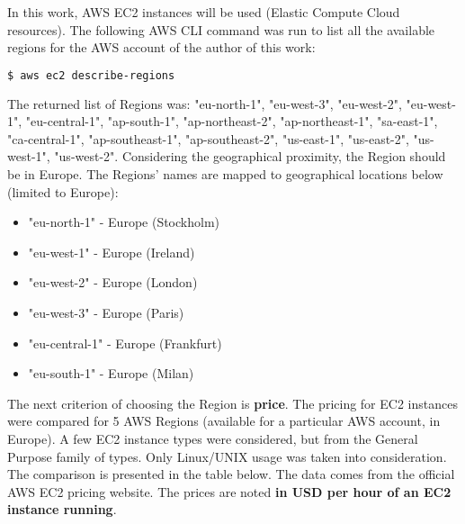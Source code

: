 In this work, AWS EC2 instances will be used (Elastic Compute Cloud resources). The following AWS CLI command was run to list all the available regions for the AWS account of the author of this work:
\begin{lstlisting}[basicstyle=\small,caption={A command of AWS CLI tool used list all the available regions (for an AWS account)},captionpos=b,language=Bash,xleftmargin=1cm]
$ aws ec2 describe-regions
\end{lstlisting}

The returned list of Regions was: "eu-north-1", "eu-west-3", "eu-west-2", "eu-west-1", "eu-central-1", "ap-south-1", "ap-northeast-2", "ap-northeast-1", "sa-east-1", "ca-central-1", "ap-southeast-1", "ap-southeast-2", "us-east-1", "us-east-2", "us-west-1", "us-west-2". Considering the geographical proximity, the Region should be in Europe. The Regions' names are mapped to geographical locations below (limited to Europe)\cite{aws-region-map}:
\begin{itemize}
\item "eu-north-1" - Europe (Stockholm)
\item "eu-west-1" - Europe (Ireland)
\item "eu-west-2" - Europe (London)
\item "eu-west-3" - Europe (Paris)
\item "eu-central-1" - Europe (Frankfurt)
\item "eu-south-1" - Europe (Milan)
\end{itemize}

The next criterion of choosing the Region is \textbf{price}. The pricing for EC2 instances were compared for 5 AWS Regions (available for a particular AWS account, in Europe). A few EC2 instance types were considered, but from the General Purpose family of types. Only Linux/UNIX usage was taken into consideration. The comparison is presented in the table below. The data comes from the official AWS EC2 pricing website\cite{ec2-pricing}. The prices are noted \textbf{in USD per hour of an EC2 instance running}.

